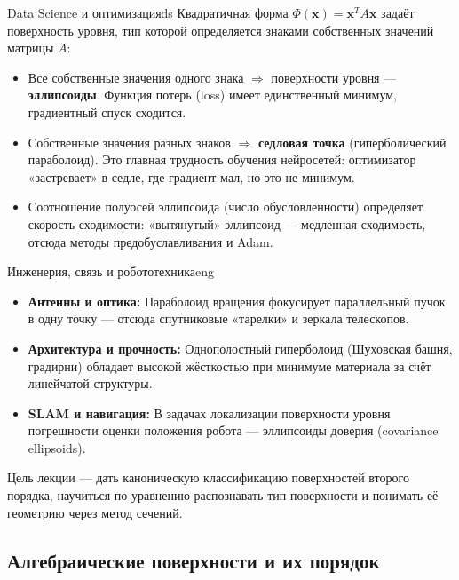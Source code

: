 \documentclass[12pt,a4paper]{article}
\begin{document}
\begin{remarkIT}{Data Science и оптимизация}{ds}
  Квадратичная форма $\Phi(\mathbf{x}) = \mathbf{x}^T A \mathbf{x}$
  задаёт поверхность уровня, тип которой определяется знаками
  собственных значений матрицы $A$:
  \begin{itemize}
    \item Все собственные значения одного знака $\Rightarrow$
      поверхности уровня — \textbf{эллипсоиды}. Функция потерь
      (loss) имеет единственный минимум, градиентный спуск сходится.
    \item Собственные значения разных знаков $\Rightarrow$
      \textbf{седловая точка} (гиперболический параболоид). Это
      главная трудность обучения нейросетей: оптимизатор «застревает»
      в седле, где градиент мал, но это не минимум.
    \item Соотношение полуосей эллипсоида (число обусловленности)
      определяет скорость сходимости: «вытянутый» эллипсоид —
      медленная сходимость, отсюда методы предобуславливания и Adam.
  \end{itemize}
\end{remarkIT}

\begin{remarkIT}{Инженерия, связь и робототехника}{eng}
  \begin{itemize}
    \item \textbf{Антенны и оптика:} Параболоид вращения фокусирует
      параллельный пучок в одну точку — отсюда спутниковые «тарелки»
      и зеркала телескопов.
    \item \textbf{Архитектура и прочность:} Однополостный гиперболоид
      (Шуховская башня, градирни) обладает высокой жёсткостью при
      минимуме материала за счёт линейчатой структуры.
    \item \textbf{SLAM и навигация:} В задачах локализации
      поверхности уровня погрешности оценки положения робота —
      эллипсоиды доверия (covariance ellipsoids).
  \end{itemize}
\end{remarkIT}

Цель лекции — дать каноническую классификацию поверхностей второго
порядка, научиться по уравнению распознавать тип поверхности и
понимать её геометрию через метод сечений.

\subsection*{Алгебраические поверхности и их порядок}
\end{document}
